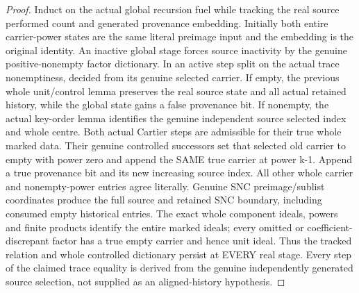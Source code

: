 \begin{proof}
Induct on the actual global recursion fuel while tracking the real source
performed count and generated provenance embedding. Initially both entire
carrier-power states are the same literal preimage input and the embedding
is the original identity. An inactive global stage forces source inactivity
by the genuine positive-nonempty factor dictionary. In an active step split
on the actual trace nonemptiness, decided from its genuine selected carrier.
If empty, the previous whole unit/control lemma preserves the real source
state and all actual retained history, while the global state gains a false
provenance bit. If nonempty, the actual key-order lemma identifies the genuine
independent source selected index and whole centre. Both actual Cartier steps
are admissible for their true whole marked data. Their genuine controlled
successors set that selected old carrier to empty with power zero and append
the SAME true carrier at power k-1. Append a true provenance bit and its new
increasing source index. All other whole carrier and nonempty-power entries
agree literally. Genuine SNC preimage/sublist coordinates produce the full
source and retained SNC boundary, including consumed empty historical entries.
The exact whole component ideals, powers and finite products identify the
entire marked ideals; every omitted or coefficient-discrepant factor has a
true empty carrier and hence unit ideal. Thus the tracked relation and whole
controlled dictionary persist at EVERY real stage. Every step of the claimed
trace equality is derived from the genuine independently generated source
selection, not supplied as an aligned-history hypothesis.
\end{proof}

